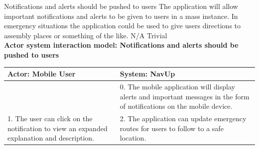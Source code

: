 \FuncReq
{Notifications and alerts should be pushed to users}
{The application will allow important notifications and alerts to be given to users in a mass instance. In emergency situations the application could be used to give users directions to assembly places or something of the like.}
{N/A}
{Trivial}
    \\
    \textbf{Actor system interaction model: Notifications and alerts should be pushed to users }\\
    \begin{tabular}{ | p{6cm} | p{6cm} |}
    \hline
    Actor: Mobile User & System: NavUp \\ \hline
     & 0. The mobile application will display alerts and important messages in the form of notifications on the mobile device.\\ \hline
    1. The user can click on the notification to view an expanded explanation and description. & 2. The application can update emergency routes for users to follow to a safe location.\\ \hline
    
    \end{tabular}
\\
\bigskip
